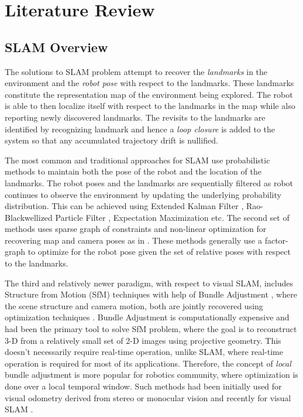\documentclass{article}
\begin{document}
\section{Literature Review}
\subsection{SLAM Overview}
The solutions to SLAM problem attempt to recover the \emph{landmarks} in the environment and the \emph{robot pose} with respect to the landmarks. These landmarks constitute the representation map of the environment being explored. The robot is able to then localize itself with respect to the landmarks in the map while also reporting newly discovered landmarks. The revisits to the landmarks are identified by recognizing landmark and hence a \emph{loop closure} is added to the system so that any accumulated trajectory drift is nullified.

The most common and traditional approaches for SLAM use probabilistic methods to maintain both the pose of the robot and the location of the landmarks. The robot poses and the landmarks are sequentially filtered as robot continues to observe the environment by updating the underlying probability distribution. This can be achieved using Extended Kalman Filter \cite{Chatila1985}, Rao-Blackwellized Particle Filter \cite{montemerlo2007fastslam}, Expectation Maximization \cite{thrun2005probabilistic} etc. The second set of methods uses sparse graph of constraints and non-linear optimization for recovering map and camera poses as in \cite{Olson2006, Thrun2006, Sunderhauf2012b}. These methods generally use a factor-graph to optimize for the robot pose given the set of relative poses with respect to the landmarks. 

The third and relatively newer paradigm, with respect to visual SLAM, includes Structure from Motion (SfM) \cite{beardsley1997sequential} techniques with help of Bundle Adjustment \cite{Triggs2000}, where the scene structure and camera motion, both are jointly recovered using optimization techniques \cite{Strasdat2010}. Bundle Adjustment is computationally expensive and had been the primary tool to solve SfM problem, where the goal is to reconstruct 3-D from a relatively small set of 2-D images using projective geometry. This doesn't necessarily require real-time operation, unlike SLAM, where real-time operation is required for most of its applications. Therefore, the concept of \emph{local} bundle adjustment is more popular for robotics community, where optimization is done over a local temporal window. Such methods had been initially used for visual odometry derived from stereo \cite{Nister2004, Pollefeys2004} or monocular vision \cite{Gr2015, Klein2007, Nister2004, Strasdat2010} and recently for visual SLAM \cite{Mur-Artal2015,Mouragnon2006}. 
\end{document}
